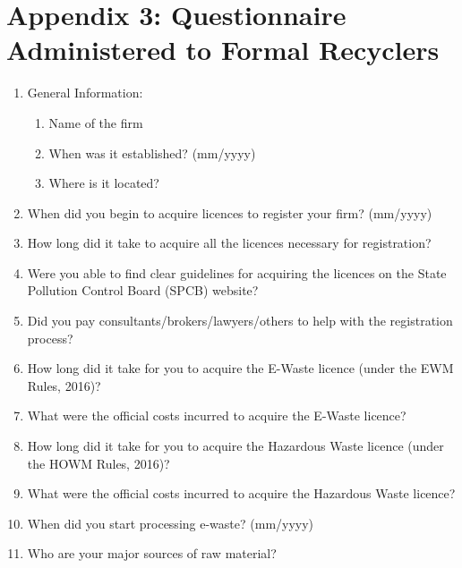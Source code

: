 \documentclass[a4paper, 12pt]{article}
\begin{document}
             \section*{Appendix 3: Questionnaire Administered to Formal Recyclers}
                    \begin{mdframed}[backgroundcolor=gray!20]
                    \begin{enumerate}
                       \item General Information:
                          \begin{enumerate}[noitemsep]
                          	 \item Name of the firm
                    	  \item When was it established? (mm/yyyy)
                    	   \item Where is it located?
                       \end{enumerate}
                       \item When did you begin to acquire licences to register your firm? (mm/yyyy)
                       \item How long did it take to acquire all the licences necessary for registration?
                       \item Were you able to find clear guidelines for acquiring the licences on the State Pollution Control Board (SPCB) website? 
                       \item Did you pay consultants/brokers/lawyers/others to help with the registration process? 
                       \item How long did it take for you to acquire the E-Waste licence (under the EWM Rules, 2016)?
                       \item What were the official costs incurred to acquire the E-Waste licence?
                       \item How long did it take for you to acquire the Hazardous Waste licence (under the HOWM Rules, 2016)? 
                        \item What were the official costs incurred to acquire the Hazardous Waste licence? 
                        \item When did you start processing e-waste? (mm/yyyy) 
                        \item Who are your major sources of raw material?

\end{enumerate}
\end{mdframed}
\end{document}
